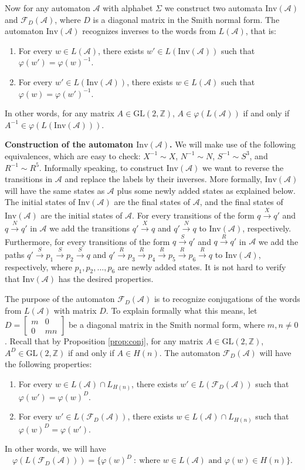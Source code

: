 \documentclass[fontsize=11pt,DIV=13,paper=letter]{scrartcl}
\theoremstyle{definition}
\newcommand{\A}{\mathcal{A}}
\newcommand{\Z}{\mathbb{Z}}
\newcommand{\F}{\mathcal{F}}
\newcommand{\GL}{\mathrm{GL}(2,\Z)}
\renewcommand{\phi}{\varphi}
\begin{document}
Now for any automaton $\A$ with alphabet $\Sigma$ we construct two automata $\mathrm{Inv}(\A)$ and $\F_D(\A)$, where $D$ is a diagonal matrix in the Smith normal form. The automaton $\mathrm{Inv}(\A)$ recognizes inverses to the words from $L(\A)$, that is:
\begin{enumerate}[(1)]
\item For every $w\in L(\A)$, there exists $w'\in L(\mathrm{Inv}(\A))$ such that $\phi(w')=\phi(w)^{-1}$.
\item For every $w'\in L(\mathrm{Inv}(\A))$, there exists $w\in L(\A)$ such that $\phi(w)=\phi(w')^{-1}$.
\end{enumerate}
In other words, for any matrix $A\in \GL$, $A\in \phi(L(\A))$ if and only if $A^{-1}\in \phi(L(\mathrm{Inv}(\A)))$.

{\bf Construction of the automaton $\mathrm{Inv}(\A)$.}
We will make use of the following equivalences, which are easy to check: $X^{-1}\sim X$, $N^{-1}\sim N$, $S^{-1}\sim S^3$, and $R^{-1}\sim R^5$. Informally speaking, to construct $\mathrm{Inv}(\A)$ we want to reverse the transitions in $\A$ and replace the labels by their inverses. More formally, $\mathrm{Inv}(\A)$ will have the same states as $\A$ plus some newly added states as explained below. The initial states of $\mathrm{Inv}(\A)$ are the final states of $\A$, and the final states of $\mathrm{Inv}(\A)$ are the initial states of $\A$. For every transitions of the form $q\xrightarrow{X} q'$ and $q\xrightarrow{N} q'$ in $\A$ we add the transitions $q'\xrightarrow{X} q$ and $q'\xrightarrow{N} q$ to $\mathrm{Inv}(\A)$, respectively. Furthermore, for every transitions of the form $q\xrightarrow{S} q'$ and $q\xrightarrow{R} q'$ in $\A$ we add the paths $q'\xrightarrow{S} p_1 \xrightarrow{S} p_2 \xrightarrow{S} q$ and $q'\xrightarrow{R} p_3 \xrightarrow{R} p_4 \xrightarrow{R} p_5 \xrightarrow{R} p_6 \xrightarrow{R} q$ to $\mathrm{Inv}(\A)$, respectively, where $p_1,p_2,\dots,p_6$ are newly added states. It is not hard to verify that $\mathrm{Inv}(\A)$ has the desired properties.

\medskip
The purpose of the automaton $\F_D(\A)$ is to recognize conjugations of the words from $L(\A)$ with matrix $D$. To explain formally what this means, let $D=\begin{bmatrix} m & 0\\ 0 & mn \end{bmatrix}$ be a diagonal matrix in the Smith normal form, where $m,n\neq 0$. Recall that by Proposition \ref{prop:conj}, for any matrix $A\in \GL$, $A^D \in \GL$ if and only if $A\in H(n)$.
The automaton $\F_D(\A)$ will have the following properties:
\begin{enumerate}[(1)]
\item For every $w\in L(\A)\cap L_{H(n)}$, there exists $w'\in L(\F_D(\A))$ such that $\phi(w')=\phi(w)^D$.
\item For every $w'\in L(\F_D(\A))$, there exists $w\in L(\A)\cap L_{H(n)}$ such that $\phi(w)^D=\phi(w')$.
\end{enumerate}
In other words, we will have
\[
\phi(L(\F_D(\A))) = \{\phi(w)^D\ :\ \text{where } w\in L(\A) \text{ and } \phi(w)\in H(n)\}.
\]
\end{document}
